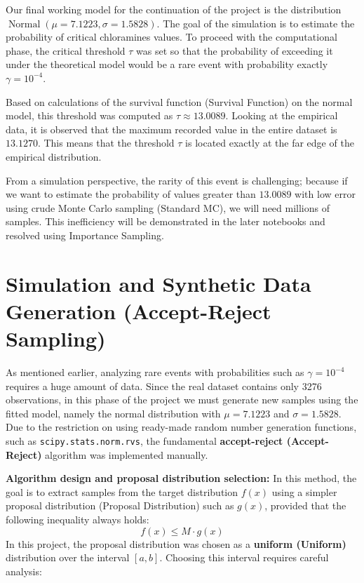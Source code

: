 \documentclass[12pt,a4paper]{article}
\begin{document}
	Our final working model for the continuation of the project is the distribution $\operatorname{Normal}(\mu=7.1223, \sigma=1.5828)$. The goal of the simulation is to estimate the probability of critical chloramines values. To proceed with the computational phase, the critical threshold $\tau$ was set so that the probability of exceeding it under the theoretical model would be a rare event with probability exactly $\gamma = 10^{-4}$.
	
	Based on calculations of the survival function (Survival Function) on the normal model, this threshold was computed as \textbf{$\tau \approx 13.0089$}. Looking at the empirical data, it is observed that the maximum recorded value in the entire dataset is \textbf{$13.1270$}. This means that the threshold $\tau$ is located exactly at the far edge of the empirical distribution.
	
	From a simulation perspective, the rarity of this event is challenging; because if we want to estimate the probability of values greater than $13.0089$ with low error using crude Monte Carlo sampling (Standard MC), we will need millions of samples. This inefficiency will be demonstrated in the later notebooks and resolved using Importance Sampling.
	
	\section{Simulation and Synthetic Data Generation (Accept-Reject Sampling)}
	
	As mentioned earlier, analyzing rare events with probabilities such as $\gamma = 10^{-4}$ requires a huge amount of data. Since the real dataset contains only 3276 observations, in this phase of the project we must generate new samples using the fitted model, namely the normal distribution with $\mu=7.1223$ and $\sigma=1.5828$. Due to the restriction on using ready-made random number generation functions, such as \texttt{scipy.stats.norm.rvs}, the fundamental \textbf{accept-reject (Accept-Reject)} algorithm was implemented manually.
	
	\textbf{Algorithm design and proposal distribution selection:}
	In this method, the goal is to extract samples from the target distribution $f(x)$ using a simpler proposal distribution (Proposal Distribution) such as $g(x)$, provided that the following inequality always holds:
	\[
	f(x) \le M \cdot g(x)
	\]
	In this project, the proposal distribution was chosen as a \textbf{uniform (Uniform)} distribution over the interval $[a,b]$. Choosing this interval requires careful analysis:
	
\end{document}
